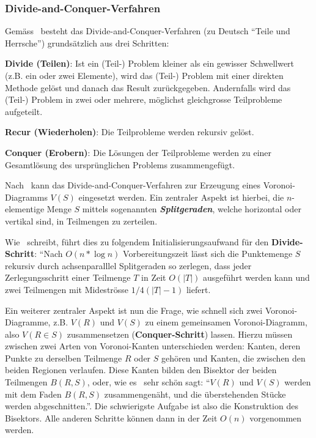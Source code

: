 \subsubsection{Divide-and-Conquer-Verfahren}
\label{ssub:voronoiAlgorithmsDivAndConq}
Gemäss~\cite{goodrich2002algorithm} besteht das Divide-and-Conquer-Verfahren (zu Deutsch ``Teile und Herrsche'') grundsätzlich aus drei Schritten:

\begin{compactitem}
    \item \textbf{Divide (Teilen)}: Ist ein (Teil-) Problem kleiner als ein gewisser Schwellwert (z.B. ein oder zwei Elemente), wird das (Teil-) Problem mit einer direkten Methode gelöst und danach das Result zurückgegeben. Andernfalls wird das (Teil-) Problem in zwei oder mehrere, möglichst gleichgrosse Teilprobleme aufgeteilt.

    \item \textbf{Recur (Wiederholen)}: Die Teilprobleme werden rekursiv gelöst.

    \item \textbf{Conquer (Erobern)}: Die Lösungen der Teilprobleme werden zu einer Gesamtlösung des ursprünglichen Problems zusammengefügt.

\end{compactitem}

Nach~\cite{shamos1975closestpoint} kann das Divide-and-Conquer-Verfahren zur Erzeugung eines Voronoi-Diagramms $V(S)$ eingesetzt werden. Ein zentraler Aspekt ist hierbei, die $n$-elementige Menge $S$ mittels sogenannten \textit{\textbf{Splitgeraden}}, welche horizontal oder vertikal sind, in Teilmengen zu zerteilen.

Wie~\cite{klein2005algorithmischegeometrie} schreibt, führt dies zu folgendem Initialisierungsaufwand für den \textbf{Divide-Schritt}: ``Nach $O(n * \log{n})$ Vorbereitungszeit lässt sich die Punktemenge $S$ rekursiv durch achsenparalllel Splitgeraden so zerlegen, dass jeder Zerlegungsschritt einer Teilmenge $T$ in Zeit $O(|T|)$ ausgeführt werden kann und zwei Teilmengen mit Mideströsse $1/4(|T| - 1)$ liefert.

Ein weiterer zentraler Aspekt ist nun die Frage, wie schnell sich zwei Voronoi-Diagramme, z.B. $V(R)$ und $V(S)$ zu einem gemeinsamen Voronoi-Diagramm, also $V(R \in S)$ zusammensetzen (\textbf{Conquer-Schritt}) lassen. Hierzu müssen zwischen zwei Arten von Voronoi-Kanten unterschieden werden: Kanten, deren Punkte zu derselben Teilmenge $R$ oder $S$ gehören und Kanten, die zwischen den beiden Regionen verlaufen. Diese Kanten bilden den Bisektor der beiden Teilmengen $B(R,S)$, oder, wie es~\cite{klein2005algorithmischegeometrie} sehr schön sagt: ``$V(R)$ und $V(S)$ werden mit dem Faden $B(R,S)$ zusammengenäht, und die überstehenden Stücke werden abgeschnitten.''. Die schwierigste Aufgabe ist also die Konstruktion des Bisektors. Alle anderen Schritte können dann in der Zeit $O(n)$ vorgenommen werden.

